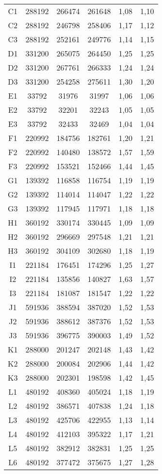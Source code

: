 \begin{center}
\begin{longtable}{cccccc}
    C1    & 288192 & 266474 & 261648 & 1,08  & 1,10 \\
    C2    & 288192 & 246798 & 258406 & 1,17  & 1,12 \\
    C3    & 288192 & 252161 & 249776 & 1,14  & 1,15 \\
    D1    & 331200 & 265075 & 264450 & 1,25  & 1,25 \\
    D2    & 331200 & 267761 & 266333 & 1,24  & 1,24 \\
    D3    & 331200 & 254258 & 275611 & 1,30  & 1,20 \\
    E1    & 33792 & 31976 & 31997 & 1,06  & 1,06 \\
    E2    & 33792 & 32201 & 32243 & 1,05  & 1,05 \\
    E3    & 33792 & 32433 & 32469 & 1,04  & 1,04 \\
    F1    & 220992 & 184756 & 182761 & 1,20  & 1,21 \\
    F2    & 220992 & 140480 & 138572 & 1,57  & 1,59 \\
    F3    & 220992 & 153521 & 152466 & 1,44  & 1,45 \\
    G1    & 139392 & 116858 & 116754 & 1,19  & 1,19 \\
    G2    & 139392 & 114014 & 114047 & 1,22  & 1,22 \\
    G3    & 139392 & 117945 & 117971 & 1,18  & 1,18 \\
    H1    & 360192 & 330174 & 330445 & 1,09  & 1,09 \\
    H2    & 360192 & 296669 & 297548 & 1,21  & 1,21 \\
    H3    & 360192 & 304109 & 302680 & 1,18  & 1,19 \\
    I1    & 221184 & 176451 & 174296 & 1,25  & 1,27 \\
    I2    & 221184 & 135856 & 140827 & 1,63  & 1,57 \\
    I3    & 221184 & 181087 & 181547 & 1,22  & 1,22 \\
    J1    & 591936 & 388594 & 387020 & 1,52  & 1,53 \\
    J2    & 591936 & 388612 & 387376 & 1,52  & 1,53 \\
    J3    & 591936 & 396775 & 390003 & 1,49  & 1,52 \\
    K1    & 288000 & 201247 & 202148 & 1,43  & 1,42 \\
    K2    & 288000 & 200084 & 202906 & 1,44  & 1,42 \\
    K3    & 288000 & 202301 & 198598 & 1,42  & 1,45 \\
    L1    & 480192 & 408360 & 405024 & 1,18  & 1,19 \\
    L2    & 480192 & 386571 & 407838 & 1,24  & 1,18 \\
    L3    & 480192 & 425706 & 422955 & 1,13  & 1,14 \\
    L4    & 480192 & 412103 & 395322 & 1,17  & 1,21 \\
    L5    & 480192 & 382912 & 382831 & 1,25  & 1,25 \\
    L6    & 480192 & 377472 & 375675 & 1,27  & 1,28 \\
\end{longtable}
\end{center}

